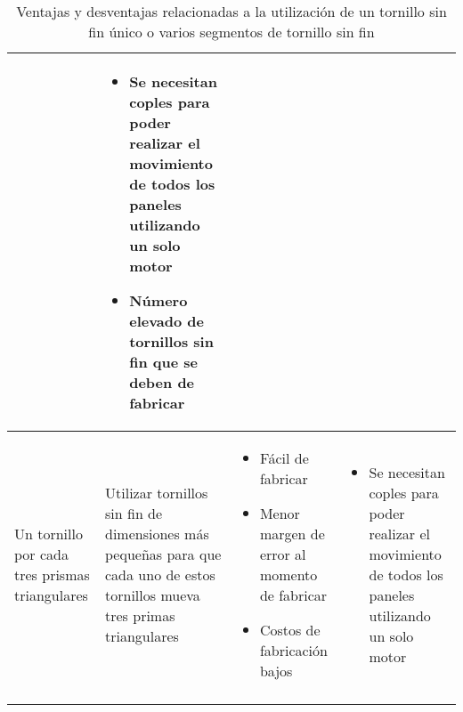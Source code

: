 \begin{center}
\begin{longtable}[!htb]{| m{7em} | m{10em} | m{12em}| m{12em}|}
\begin{itemize}
    \end{itemize}
    & 
    \begin{itemize}
        \item Se necesitan coples para poder realizar el movimiento de todos los paneles utilizando un solo motor
        \item Número elevado de tornillos sin fin que se deben de fabricar
    \end{itemize}\\
    \hline
    Un tornillo por cada tres prismas triangulares& Utilizar tornillos sin fin de dimensiones más pequeñas para que cada uno de estos tornillos mueva tres primas triangulares& 
    \begin{itemize}
        \item Fácil de fabricar
        \item Menor margen de error al momento de fabricar
        \item Costos de fabricación bajos
    \end{itemize}
    & 
    \begin{itemize}
        \item Se necesitan coples para poder realizar el movimiento de todos los paneles utilizando un solo motor
    \end{itemize}\\
    \hline
    \caption{Ventajas y desventajas relacionadas a la utilización de un tornillo sin fin único o varios segmentos de tornillo sin fin}
    \label{tab:ComTornilloSF}
    \end{longtable}
\end{center}

